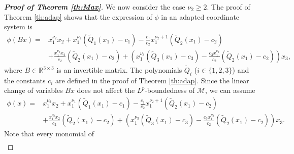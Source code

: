 \documentclass[a4paper, 11pt]{article}
\theoremstyle{plain}
\theoremstyle{definition}
\theoremstyle{lemma}
\theoremstyle{Remark}
\theoremstyle{proposition}
\theoremstyle{corollary}
\theoremstyle{example}
\theoremstyle{assumption}
\begin{document}
\begin{proof}[\textbf{Proof of Theorem \ref{th:Max}}]
We now consider the case  $\nu_2\ge2$.
The proof of Theorem \ref{th:adap} shows that the expression of $\phi$ in an adapted coordinate system is
\begin{align*}
\phi(Bx)=&x_1^{\nu_2}x_2+x_1^{\nu_1}(\tilde Q_1(x_1)-c_1)-\frac{c_1}{c_2}x_1^{\nu_2+1}(\tilde Q_2(x_1)-c_2) \\& +\frac{x_1^{\nu_2}x_2}{c_2}(\tilde Q_2(x_1)-c_2)+\left(x_1^{\nu_3}(\tilde Q_3(x_1)-c_3)-\frac{c_3x_1^{\nu_2} }{c_2}(\tilde Q_2(x_1)-c_2)\right)x_3,
\end{align*}
where $B\in \mathbb{R}^{3\times 3}$ is an invertible matrix.  The polynomials $\tilde{Q}_i$ ($i\in \{1,2,3\}$) and the constants $c_i$ are defined in the proof of Theorem \ref{th:adap}.
Since the linear change of variables $Bx$ does not affect the $L^p$-boundedness of $\mathcal{M}$, we can assume
\begin{align*}
\phi(x)=&x_1^{\nu_2}x_2+x_1^{\nu_1}(\tilde Q_1(x_1)-c_1)-\frac{c_1}{c_2}x_1^{\nu_2+1}(\tilde Q_2(x_1)-c_2) \\& +\frac{x_1^{\nu_2}x_2}{c_2}(\tilde Q_2(x_1)-c_2)+\left(x_1^{\nu_3}(\tilde Q_3(x_1)-c_3)-\frac{c_3x_1^{\nu_2} }{c_2}(\tilde Q_2(x_1)-c_2)\right)x_3.
\end{align*}
Note that every monomial  of
\begin{align*}

\end{align*}
\end{proof}
\end{document}
